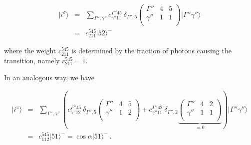\documentclass[twocolumn,prb,twocolumn,amsmath,superscriptaddress,nofootinbib,amssymb]{revtex4-1}
\begin{document}
\begin{widetext}
\begin{eqnarray}
|i^{\sigma}\rangle&=&\sum_{\Gamma'',\gamma''} c^{\Gamma''45}_{\gamma''11}~\delta_{\Gamma'',5} \left(
                                                                             \begin{array}{ccc}
                                                                               \Gamma'' & 4 & 5 \\
                                                                                \gamma''& 1 & 1 \\
                                                                             \end{array}
                                                                           \right)|\Gamma''\gamma''\rangle \nonumber\\
&=&c^{545}_{211}|52\rangle^-
\end{eqnarray}

\noindent where the weight $c^{545}_{211}$ is determined by the fraction of photons causing the transition, namely $c^{545}_{211}=1$.

In an analogous way, we have

\begin{eqnarray}
|i^{\pi}\rangle&=&\sum_{\Gamma'',\gamma''} \left(c^{\Gamma''45}_{\gamma''12}~\delta_{\Gamma'',5} \left(
                                                                             \begin{array}{ccc}
                                                                               \Gamma'' & 4 & 5 \\
                                                                                \gamma''& 1 & 2 \\
                                                                             \end{array}
                                                                           \right)+
c^{\Gamma''42}_{\gamma''11}~\delta_{\Gamma'',2} \underbrace{\left(
                                                                             \begin{array}{ccc}
                                                                               \Gamma'' & 4 & 2 \\
                                                                                \gamma''& 1 & 1 \\
                                                                             \end{array}
                                                                           \right)}_{=0}\right)|\Gamma''\gamma''\rangle \nonumber\\                                                                      &=& c^{545}_{112} |51\rangle^-=\cos\alpha  |51\rangle^-~.
\end{eqnarray}



\end{widetext}
\end{document}
